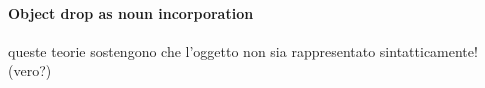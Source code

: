 

\paragraph{Object drop as noun incorporation}
queste teorie sostengono che l'oggetto non sia rappresentato sintatticamente! (vero?)

